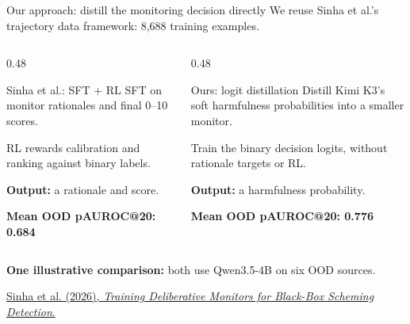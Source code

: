 \begin{frame}{Our approach: distill the monitoring decision directly}
    We reuse Sinha et al.'s trajectory data framework: 8,688 training examples.
    \medskip

    \begin{columns}[T,onlytextwidth]
        \begin{column}{0.48\textwidth}
            \begin{block}{Sinha et al.: SFT + RL}
                SFT on monitor rationales and final 0--10 scores.
                \medskip

                RL rewards calibration and ranking against binary labels.
                \medskip

                \textbf{Output:} a rationale and score.
                \bigskip

                \textbf{Mean OOD pAUROC@20: 0.684}
            \end{block}
        \end{column}
        \begin{column}{0.48\textwidth}
            \begin{block}{Ours: logit distillation}
                Distill Kimi K3's soft harmfulness probabilities into a smaller monitor.
                \medskip

                Train the binary decision logits, without rationale targets or RL.
                \medskip

                \textbf{Output:} a harmfulness probability.
                \bigskip

                \textbf{Mean OOD pAUROC@20: 0.776}
            \end{block}
        \end{column}
    \end{columns}
    \medskip
    {\small \textbf{One illustrative comparison:} both use Qwen3.5-4B on six OOD sources.}
    \medskip

    {\scriptsize \href{https://arxiv.org/abs/2605.29601}{Sinha et al. (2026),
    \emph{Training Deliberative Monitors for Black-Box Scheming Detection}.}}
\end{frame}

